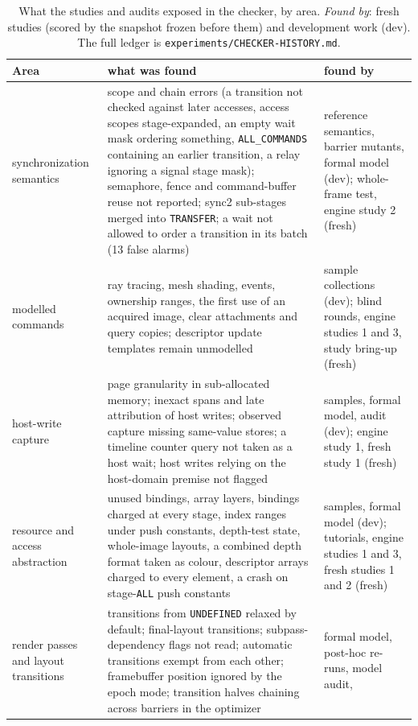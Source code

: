 \documentclass[acmtog,anonymous,review]{acmart}
\newcommand{\code}[1]{\texttt{#1}}
\begin{document}
\begin{table}[t]
\caption{What the studies and audits exposed in the checker, by area. \emph{Found by}: fresh studies (scored by the
snapshot frozen before them) and development work (dev). The full ledger is \code{experiments/CHECKER-HISTORY.md}.}
\label{tab:s-exposed}
\small
\begin{tabular}{@{}p{}p{}p{}@{}}
\toprule
Area & what was found & found by \\
\midrule
synchronization semantics & scope and chain errors (a transition not checked against later accesses, access scopes
stage-expanded, an empty wait mask ordering something, \code{ALL\_COMMANDS} containing an earlier transition, a relay
ignoring a signal stage mask); semaphore, fence and command-buffer reuse not reported; sync2 sub-stages merged into
\code{TRANSFER}; a wait not allowed to order a transition in its batch (13 false alarms) & reference semantics,
barrier mutants, formal model (dev); whole-frame test, engine study 2 (fresh) \\
modelled commands & ray tracing, mesh shading, events, ownership ranges, the first use of an acquired image, clear
attachments and query copies; descriptor update templates remain unmodelled & sample collections (dev); blind rounds,
engine studies 1 and 3, study bring-up (fresh) \\
host-write capture & page granularity in sub-allocated memory; inexact spans and late attribution of host writes;
observed capture missing same-value stores; a timeline counter query not taken as a host wait; host writes relying on
the host-domain premise not flagged & samples, formal model, audit (dev); engine study 1, fresh study 1 (fresh) \\
resource and access abstraction & unused bindings, array layers, bindings charged at every stage, index ranges under
push constants, depth-test state, whole-image layouts, a combined depth format taken as colour, descriptor arrays
charged to every element, a crash on stage-\code{ALL} push constants & samples, formal model (dev); tutorials, engine
studies 1 and 3, fresh studies 1 and 2 (fresh) \\
render passes and layout transitions & transitions from \code{UNDEFINED} relaxed by default; final-layout transitions;
subpass-dependency flags not read; automatic transitions exempt from each other; framebuffer position ignored by the
epoch mode; transition halves chaining across barriers in the optimizer & formal model, post-hoc re-runs, model audit,

\end{tabular}
\end{table}
\end{document}
